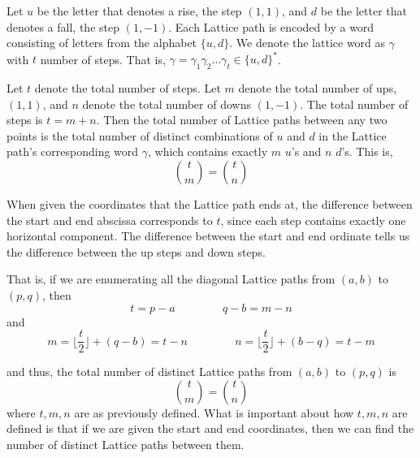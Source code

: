 \documentclass[12pt]{article}
\theoremstyle{definition}
\numberwithin{equation}{section}
\newcommand{\set}[1]{\{#1\}}
\newcommand{\floor}[1]{\Big\lfloor #1 \Big\rfloor}
\begin{document}
Let $u$ be the letter that denotes a rise, the step $(1,1)$, and $d$ be the letter that denotes a fall, the step $(1,-1)$. Each Lattice path is encoded by a word consisting of letters from the alphabet $\set{u,d}$. We denote the lattice word as $\gamma$ with $t$ number of steps. That is, $\gamma = \gamma_1\gamma_2\ldots\gamma_{t}\in \set{u,d}^*$.


Let $t$ denote the total number of steps. Let $m$ denote the total number of ups, $(1,1)$, and $n$ denote the total number of downs $(1,-1)$. The total number of steps is $t = m + n$. Then the total number of Lattice paths between any two points is the total number of distinct combinations of $u$ and $d$ in the Lattice path's corresponding word $\gamma$, which contains exactly $m$ $u$'s and $n$ $d$'s. This is,
\begin{equation*}
    \binom{t}{m} = \binom{t}{n}
\end{equation*}

When given the coordinates that the Lattice path ends at, the difference between the start and end abscissa corresponds to $t$, since each step contains exactly one horizontal component. The difference between the start and end ordinate tells us the difference between the up steps and down steps. 

That is, if we are enumerating all the diagonal Lattice paths from $(a,b)$ to $(p,q)$, then 
\begin{equation}
    t = p - a \hspace{50pt} q - b = m - n
\end{equation} and
\begin{equation}
     m = \floor{\frac{t}{2}} + (q - b) = t -n \hspace{50pt} n = \floor{\frac{t}{2}} + (b - q)  = t - m
\end{equation}

and thus, the total number of distinct Lattice paths from $(a,b)$ to $(p,q)$ is \begin{equation}
    \binom{t}{m}=\binom{t}{n}
\end{equation} where $t,m,n$ are as previously defined. What is important about how $t,m,n$ are defined is that if we are given the start and end coordinates, then we can find the number of distinct Lattice paths between them.
\end{document}
